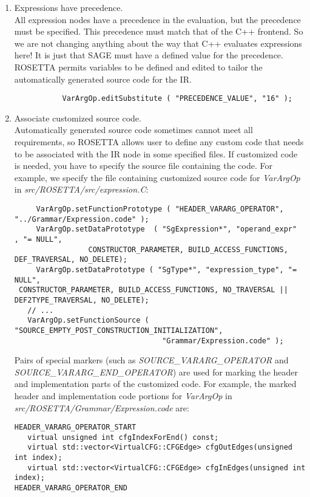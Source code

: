 \begin{enumerate}
    \item Expressions have precedence. \\
           All expression nodes have a precedence in the evaluation, but the precedence must
           be specified.  This precedence must match that of the C++ frontend.  So we 
           are not changing anything about the way that C++ evaluates expressions here!
           It is just that SAGE must have a defined value for the precedence.
           ROSETTA permits variables to be defined and edited to tailor the automatically
           generated source code for the IR.
{\indent
{\mySmallFontSize
\begin{verbatim}
           VarArgOp.editSubstitute ( "PRECEDENCE_VALUE", "16" );
\end{verbatim} 
}}
     \item Associate customized source code. \\
           Automatically generated source code sometimes cannot meet all
           requirements, so ROSETTA allows user to define any custom 
           code that needs to be associated with the IR node in some
           specified files. If customized code is needed, you have to
           specify the source file containing the code. 
           For example, we specify the file containing customized source
           code for {\em VarArgOp} in \textit{src/ROSETTA/src/expression.C}:
{\indent
{\mySmallFontSize
\begin{verbatim}
     VarArgOp.setFunctionPrototype ( "HEADER_VARARG_OPERATOR", "../Grammar/Expression.code" );
     VarArgOp.setDataPrototype  ( "SgExpression*", "operand_expr"   , "= NULL",
				 CONSTRUCTOR_PARAMETER, BUILD_ACCESS_FUNCTIONS, DEF_TRAVERSAL, NO_DELETE);
     VarArgOp.setDataPrototype ( "SgType*", "expression_type", "= NULL",
 CONSTRUCTOR_PARAMETER, BUILD_ACCESS_FUNCTIONS, NO_TRAVERSAL || DEF2TYPE_TRAVERSAL, NO_DELETE);
   // ...
   VarArgOp.setFunctionSource ( "SOURCE_EMPTY_POST_CONSTRUCTION_INITIALIZATION", 
                                  "Grammar/Expression.code" );
\end{verbatim} 
}}
           Pairs of special markers (such as {\em SOURCE\_VARARG\_OPERATOR}
           and {\em SOURCE\_VARARG\_END\_OPERATOR}) are used for marking the header 
           and implementation parts of the customized code. 
           For example, the marked header and implementation code portions 
           for {\em VarArgOp} in
           \textit{src/ROSETTA/Grammar/Expression.code} are:
{\indent
  {\mySmallFontSize
\begin{verbatim}
HEADER_VARARG_OPERATOR_START
   virtual unsigned int cfgIndexForEnd() const;
   virtual std::vector<VirtualCFG::CFGEdge> cfgOutEdges(unsigned int index);
   virtual std::vector<VirtualCFG::CFGEdge> cfgInEdges(unsigned int index);
HEADER_VARARG_OPERATOR_END


\end{verbatim}}}
\end{enumerate}

